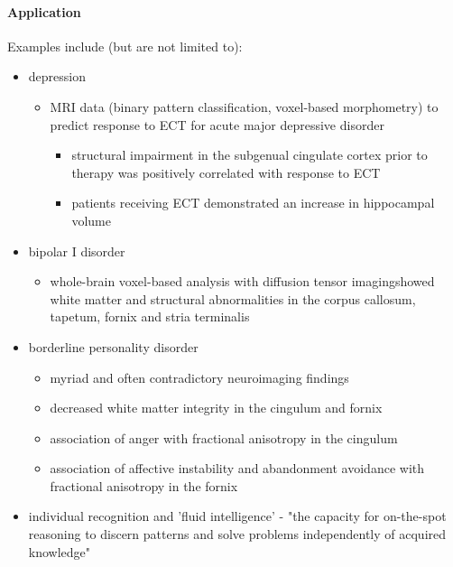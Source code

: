 \paragraph{Application}

Examples include (but are not limited to):

\begin{itemize}
	\item
	depression
	
	\begin{itemize}
		\item
		MRI data (binary pattern classification, voxel-based morphometry) to predict response to ECT for acute major depressive disorder 
		
		\begin{itemize}
			\item
			structural impairment in the subgenual cingulate cortex prior to therapy was positively correlated with response to ECT 
			\item
			patients receiving ECT demonstrated an increase in hippocampal volume 
		\end{itemize}
	\end{itemize}
	\item
	bipolar I disorder
	
	\begin{itemize}
		\item
		whole-brain voxel-based analysis with diffusion tensor imagingshowed white matter and structural abnormalities in the corpus callosum, tapetum, fornix and stria terminalis 
	\end{itemize}
	\item
	borderline personality disorder
	
	\begin{itemize}
		\item
		myriad and often contradictory neuroimaging findings 
		\item
		decreased white matter integrity in the cingulum and fornix
		\item
		association of anger with fractional anisotropy in the cingulum 
		\item
		association of affective instability and abandonment avoidance with fractional anisotropy in the fornix 
	\end{itemize}
	\item
	individual recognition and 'fluid intelligence' - "the capacity for on-the-spot reasoning to discern patterns and solve problems independently of acquired knowledge"
	

\end{itemize}

